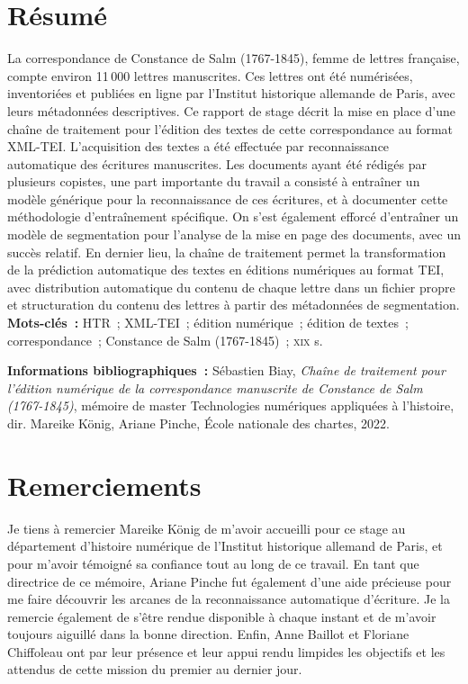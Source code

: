 \documentclass[a4paper,12pt,twoside]{book}
\newcommand{\siecle}[1]{\textsc{#1}\ieme}
\begin{document}
	\chapter*{Résumé}
		\medskip
		La correspondance de Constance de Salm (1767-1845), femme de lettres française, compte environ 11\,000 lettres manuscrites. Ces lettres ont été numérisées, inventoriées et publiées en ligne par l'Institut historique allemande de Paris, avec leurs métadonnées descriptives. Ce rapport de stage décrit la mise en place d'une chaîne de traitement pour l'édition des textes de cette correspondance au format XML-TEI. L'acquisition des textes a été effectuée par reconnaissance automatique des écritures manuscrites. Les documents ayant été rédigés par plusieurs copistes, une part importante du travail a consisté à entraîner un modèle générique pour la reconnaissance de ces écritures, et à documenter cette méthodologie d'entraînement spécifique. On s'est également efforcé d'entraîner un modèle de segmentation pour l'analyse de la mise en page des documents, avec un succès relatif. En dernier lieu, la chaîne de traitement permet la transformation de la prédiction automatique des textes en éditions numériques au format TEI, avec distribution automatique du contenu de chaque lettre dans un fichier propre et structuration du contenu des lettres à partir des métadonnées de segmentation.\\
		
		\textbf{Mots-clés~:} HTR~; XML-TEI~; édition numérique~; édition de textes~; correspondance~; Constance de Salm (1767-1845)~; \siecle{xix} s.
		
		\textbf{Informations bibliographiques~:} Sébastien Biay, \textit{Chaîne de traitement pour l'édition numérique de la correspondance manuscrite de Constance de Salm (1767-1845)}, mémoire de master \og{}Technologies numériques appliquées à l'histoire\fg{}, dir. Mareike König, Ariane Pinche, École nationale des chartes, 2022.
		
	\pagestyle{empty}	
	\cleardoublepage

	\pagestyle{plain}
	\chapter*{Remerciements}
	
		Je tiens à remercier Mareike König de m'avoir accueilli pour ce stage au département d'histoire numérique de l'Institut historique allemand de Paris, et pour m'avoir témoigné sa confiance tout au long de ce travail. En tant que directrice de ce mémoire, Ariane Pinche fut également d'une aide précieuse pour me faire découvrir les arcanes de la reconnaissance automatique d'écriture. Je la remercie également de s'être rendue disponible à chaque instant et de m'avoir toujours aiguillé dans la bonne direction. Enfin, Anne Baillot et Floriane Chiffoleau ont par leur présence et leur appui rendu limpides les objectifs et les attendus de cette mission du premier au dernier jour.
		
\end{document}
